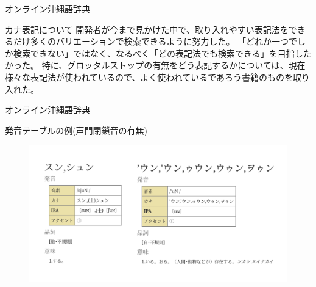 \documentclass[14pt]{beamer}
\begin{document}
\begin{frame}{オンライン沖縄語辞典}
  \begin{block}{カナ表記について}
    \vspace{0pt}
    開発者が今まで見かけた中で、取り入れやすい表記法をできるだけ多くのバリエーションで検索できるように努力した。
    「どれか一つでしか検索できない」ではなく、なるべく「どの表記法でも検索できる」を目指したかった。
    特に、グロッタルストップの有無をどう表記するかについては、現在様々な表記法が使われているので、よく使われているであろう書籍のものを取り入れた。
  \end{block}
\end{frame}

\begin{frame}{オンライン沖縄語辞典}
  \begin{block}{発音テーブルの例(声門閉鎖音の有無)}
    \begin{figure}[ht]
      \centering
        \includegraphics[height=0.5\paperheight,width=0.8\paperwidth]{okinawago-app-pronunciation-example2.png}
    \end{figure}
  \end{block}
\end{frame}
\end{document}
